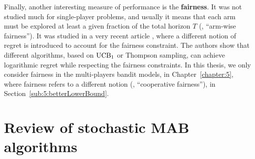 

Finally, another interesting measure of performance is the \textbf{fairness}.
It was not studied much for single-player problems, and usually it means that each arm must be explored at least a given fraction of the total horizon $T$ (\ie, ``arm-wise fairness'').
It was studied in a very recent article \cite{Patil2019stochastic},
where a different notion of regret is introduced to account for the fairness constraint. The authors show that different algorithms, based on $\mathrm{UCB}_1$ or Thompson sampling, can achieve logarithmic regret while respecting the fairness constraints.
%
In this thesis, we only consider fairness in the multi-players bandit models,
in Chapter~\ref{chapter:5}, where fairness refers to a different notion (\ie, ``cooperative fairness''),
in Section~\ref{sub:5:betterLowerBound}.


\section{Review of stochastic MAB algorithms}
\label{sec:2:famousMABalgorithms}

